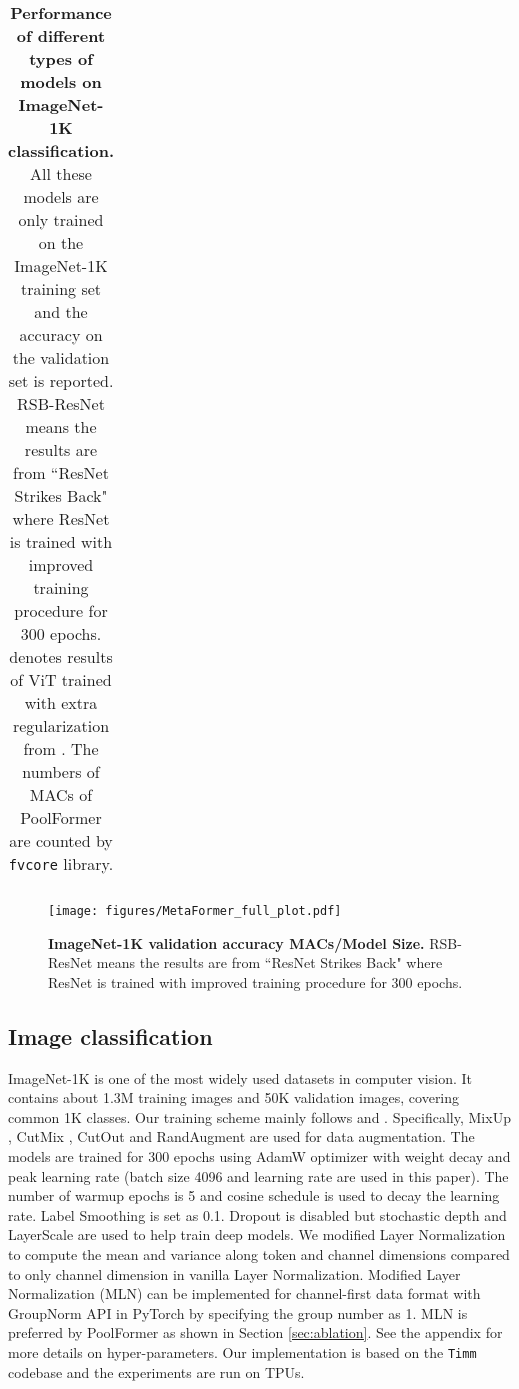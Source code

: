 \begin{table*}[t]
\begin{tabular}{c|clccccccc}
    \end{tabular}     \vspace{-3mm}
    \caption{
    \textbf{Performance of different types of models on ImageNet-1K  classification.} 
    All these models are only trained on the ImageNet-1K training set and the accuracy on the validation set is reported. RSB-ResNet means the results are from ``ResNet Strikes Back" \cite{resnet_improved} where ResNet \cite{resnet} is trained with improved training procedure for 300 epochs.  denotes results of ViT trained with extra regularization from \cite{mlp-mixer}. The numbers of MACs of PoolFormer are counted by \texttt{fvcore} \cite{fvcore} library.
    \label{tab:imagenet}}
    \vspace{-2mm}
\end{table*}

\begin{figure*}[t]
  \centering
   \texttt{[image: figures/MetaFormer\_full\_plot.pdf]}
   \vspace{-4mm}
   \caption{\textbf{ImageNet-1K validation accuracy \vs MACs/Model Size.} RSB-ResNet means the results are from ``ResNet Strikes Back" \cite{resnet_improved} where ResNet \cite{resnet} is trained with improved training procedure for 300 epochs.}
   \label{fig:overall_comparision}
\vspace{-1mm}
\end{figure*}


\subsection{Image classification}
ImageNet-1K \cite{imagenet} is one of the most widely used datasets in computer vision. It contains about 1.3M training images and 50K validation images, covering common 1K classes. Our training scheme mainly follows \cite{deit} and \cite{cait}. Specifically, MixUp \cite{mixup}, CutMix \cite{cutmix}, CutOut \cite{cutout} and RandAugment \cite{randaugment} are used for data augmentation. The models are trained for 300 epochs using AdamW optimizer \cite{adam, adamw} with weight decay  and peak learning rate  (batch size 4096 and learning rate  are used in this paper). The number of warmup epochs is 5 and cosine schedule is used to decay the learning rate. Label Smoothing \cite{label_smoothing} is set as 0.1. Dropout is disabled but stochastic depth \cite{stochastic_depth} and LayerScale \cite{cait} are used to help train deep models. 
We modified Layer Normalization \cite{layer_norm} to compute the mean and variance along token and channel dimensions compared to only channel dimension in vanilla Layer Normalization. Modified Layer Normalization (MLN) can be implemented for channel-first data format with GroupNorm API in PyTorch by specifying the group number as 1. MLN is preferred by PoolFormer as shown in Section \ref{sec:ablation}. See the appendix for more details on hyper-parameters. Our implementation is based on the \texttt{Timm} codebase \cite{timm} and the experiments are run on TPUs. 


